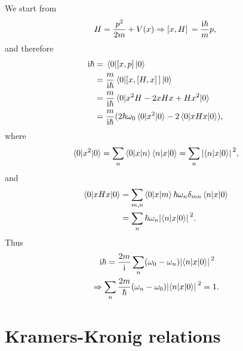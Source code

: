 \documentclass[hyperref, a4paper]{article}
\newcommand*{\ii}{\mathrm{i}}
\begin{document}
We start from 
\begin{equation}
    H = \frac{p^2}{2m} + V(x) \Rightarrow \comm*{x}{H} = \frac{\ii \hbar}{m} p,
\end{equation}
and therefore 
\begin{equation}
    \begin{aligned}
        \ii \hbar &= \expval*{\comm*{x}{p}}{0} \\
        &= \frac{m}{\ii \hbar} \expval*{\comm*{x}{\comm*{H}{x}}}{0} \\
        &= \frac{m}{\ii \hbar} \expval*{
            x^2 H - 2 xHx + H x^2
        }{0} \\
        &= \frac{m}{\ii \hbar} (
            2 \hbar \omega_0 \expval*{x^2}{0} 
            - 2 \expval*{x H x}{0}
        ) ,
    \end{aligned}
\end{equation}
where 
\begin{equation}
    \begin{aligned}
        \expval*{x^2}{0} = \sum_{n} \mel**{0}{x}{n} \mel**{n}{x}{0} 
        = \sum_n \abs*{\mel**{n}{x}{0}}^2,
    \end{aligned}
\end{equation}
and 
\begin{equation}
    \begin{aligned}
        \expval*{x H x}{0} &= \sum_{m, n} \mel**{0}{x}{m} \hbar \omega_n \delta_{mn} \mel**{n}{x}{0} \\
        &= \sum_n \hbar \omega_n \abs*{\mel**{n}{x}{0}}^2.
    \end{aligned}
\end{equation}
Thus 
\begin{equation}
    \begin{aligned}
        &\quad \ii \hbar = \frac{2m}{\ii} \sum_n (\omega_0 - \omega_n) \abs*{\mel**{n}{x}{0}}^2 \\
        &\Rightarrow \sum_n \frac{2m}{\hbar} (\omega_n - \omega_0) \abs*{\mel**{n}{x}{0}}^2 = 1.
    \end{aligned}
\end{equation}

\section{Kramers-Kronig relations}
\end{document}
